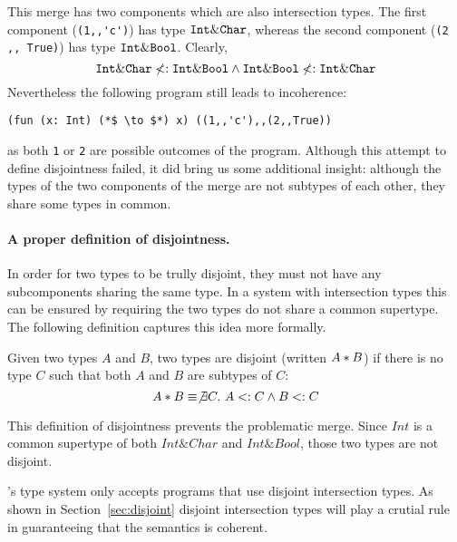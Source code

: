 \noindent This merge has two components which are also intersection
types. The first component (\lstinline{(1,,'c')}) has type $\texttt{Int} \&
\texttt{Char}$, whereas the second component (\lstinline{(2 ,, True)}) has type
$\texttt{Int} \& \texttt{Bool}$. Clearly,
\[ \texttt{Int} \& \texttt{Char} \not <: \texttt{Int} \& \texttt{Bool} \wedge \texttt{Int} \& \texttt{Bool} \not <: \texttt{Int} \& \texttt{Char} \]
Nevertheless the following program still leads to
incoherence:
\begin{lstlisting}
(fun (x: Int) (*$ \to $*) x) ((1,,'c'),,(2,,True))
\end{lstlisting}
as both \lstinline{1} or \lstinline{2} are possible outcomes
of the program. Although this attempt to define disjointness failed,
it did bring us some additional insight: although the types of the two
components of the merge are not subtypes of each other, they share
some types in common.

\paragraph{A proper definition of disjointness.} In order for two types
to be trully disjoint, they must not have any subcomponents sharing
the same type. In a system with intersection types this can be ensured
by requiring the two types do not share a common supertype. The
following definition captures this idea more formally.

\begin{definition}[Disjointness]
  Given two types $A$ and $B$, two types are disjoint
  (written $A * B$) if there is no type $C$ such that both $A$ and $B$ are
  subtypes of $C$:
  \[A * B \equiv \not\exists C.~A <: C \wedge B <: C\]
\end{definition}

\noindent This definition of disjointness prevents the problematic
merge. Since $Int$ is a common supertype of both $Int \& Char$ and
$Int \& Bool$, those two types are not disjoint.

\namedis's type system only accepts programs that use disjoint
intersection types. As shown in Section~\ref{sec:disjoint} disjoint intersection
types will play a crutial rule in guaranteeing that the semantics is coherent.

